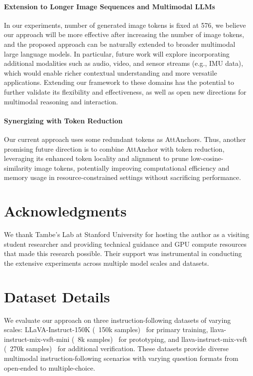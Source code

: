 \documentclass[11pt]{article}
\begin{document}
\paragraph{Extension to Longer Image Sequences and Multimodal LLMs} 
In our experiments, number of generated image tokens is fixed at 576, we believe our approach will be more effective after increasing the number of image tokens, and the proposed approach can be naturally extended to broader multimodal large language models. In particular, future work will explore incorporating additional modalities such as audio, video, and sensor streams (e.g., IMU data), which would enable richer contextual understanding and more versatile applications. Extending our framework to these domains has the potential to further validate its flexibility and effectiveness, as well as open new directions for multimodal reasoning and interaction.

\paragraph{Synergizing with Token Reduction} Our current approach uses some redundant tokens as AttAnchors. Thus, another promising future direction is to combine AttAnchor  with token reduction, leveraging its enhanced token locality and alignment to prune low-cosine-similarity image tokens, potentially improving computational efficiency and memory usage in resource-constrained settings without sacrificing performance.


\section{Acknowledgments}

We thank Tambe's Lab at Stanford University for hosting the author as a visiting student researcher and providing technical guidance and GPU compute resources that made this research possible. Their support was instrumental in conducting the extensive experiments across multiple model scales and datasets.





\appendix
\section{Dataset Details}
\label{app:datasets}


We evaluate our approach on three instruction-following datasets of varying scales: LLaVA-Instruct-150K (~150k samples)~\citep{liu2023llava} for primary training, llava-instruct-mix-vsft-mini (~8k samples)~\citep{unsloth_llava_instruct_mix_vsft_mini} for prototyping, and llava-instruct-mix-vsft (~270k samples)~\citep{huggingfaceh4_llava_instruct_mix_vsft} for additional verification. These datasets provide diverse multimodal instruction-following scenarios with varying question formats from open-ended to multiple-choice. 
\end{document}
